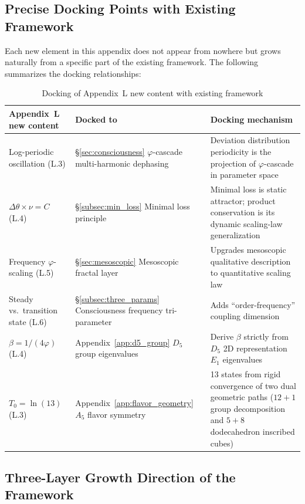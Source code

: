 \documentclass[12pt,a4paper,twocolumn]{article}
\renewcommand{\phi}{\varphi}
\begin{document}
\subsection{Precise Docking Points with Existing Framework}
\label{subsec:docking_points_en}

Each new element in this appendix does not appear from nowhere but grows naturally from a specific part of the existing framework. The following summarizes the docking relationships:

\begin{table}[htbp]
\centering
\caption{Docking of Appendix~L new content with existing framework}
\label{tab:docking_points_en}
\begin{tabular}{llp{6cm}}
\hline
Appendix~L new content & Docked to & Docking mechanism \\
\hline
Log-periodic oscillation (L.3) & \S\ref{sec:consciousness} $\phi$-cascade multi-harmonic dephasing & Deviation distribution periodicity is the projection of $\phi$-cascade in parameter space \\
$\Delta\theta \times \nu = C$ (L.4) & \S\ref{subsec:min_loss} Minimal loss principle & Minimal loss is static attractor; product conservation is its dynamic scaling-law generalization \\
Frequency $\phi$-scaling (L.5) & \S\ref{sec:mesoscopic} Mesoscopic fractal layer & Upgrades mesoscopic qualitative description to quantitative scaling law \\
Steady vs.\ transition state (L.6) & \S\ref{subsec:three_params} Consciousness frequency tri-parameter & Adds ``order-frequency'' coupling dimension \\
$\beta = 1/(4\phi)$ (L.4) & Appendix~\ref{app:d5_group} $D_5$ group eigenvalues & Derive $\beta$ strictly from $D_5$ 2D representation $E_1$ eigenvalues \\
$T_0 = \ln(13)$ (L.3) & Appendix~\ref{app:flavor_geometry} $A_5$ flavor symmetry & 13 states from rigid convergence of two dual geometric paths ($12+1$ group decomposition and $5+8$ dodecahedron inscribed cubes) \\
\hline
\end{tabular}
\end{table}

\subsection{Three-Layer Growth Direction of the Framework}
\label{subsec:three_layers_en}
\end{document}
